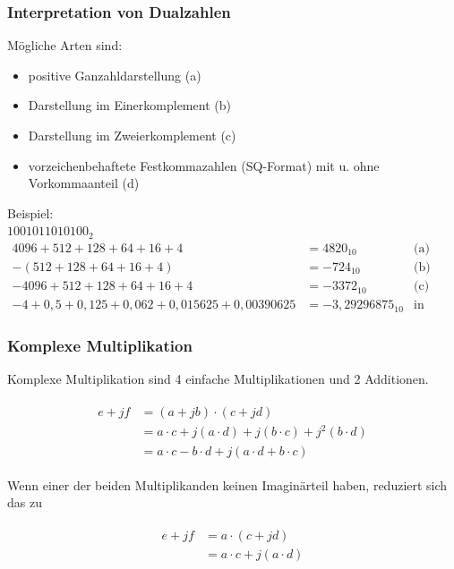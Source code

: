 

\begin{frame}\frametitle{Interpretation von Dualzahlen}
 \medskip
 Mögliche Arten sind:
 \begin{itemize}
  \item positive Ganzahldarstellung (a)
  \item Darstellung im Einerkomplement (b)
  \item Darstellung im Zweierkomplement (c)
  \item vorzeichenbehaftete Festkommazahlen (SQ-Format) mit u. ohne Vorkommaanteil (d)
 \end{itemize}
\medskip
\pause
Beispiel:\\
\medskip
\hspace{1cm}$1001011010100_2$
 \begin{align*}
    4096+512+128+64+16+4 &=  4820_{10}   &\textrm{(a)}\\
    - (512+128+64+16+4) & = -724_{10}   &\textrm{(b)}\\
   -4096+512+128+64+16+4 &= -3372_{10}   &\textrm{(c)}\\
   -4+0,5+0,125+0,062+0,015625+0,00390625 &= -3,29296875_{10} &\textrm{in S2Q10 (d)}
 \end{align*} 
\end{frame}

\begin{frame}\frametitle{Komplexe Multiplikation}

Komplexe Multiplikation sind 4 einfache Multiplikationen und 2 Additionen.

 \begin{align*}\label{eq:komplexe_Multiplikation}
\begin{split}
 e + jf &= (a + jb) \cdot (c + jd)\\
        &= a \cdot c + j(a \cdot d) + j(b \cdot c) + j^2(b \cdot d)\\
        &= a \cdot c - b \cdot d + j(a \cdot d + b \cdot c)
\end{split}
  \end{align*}
  
  Wenn einer der beiden Multiplikanden keinen Imaginärteil haben, reduziert sich das zu 

 \begin{align*}\label{eq:halb_komplexe_Multiplikation}
 \begin{split}
  e + jf &= a \cdot (c + jd)\\
         &= a \cdot c + j(a \cdot d)\\
 \end{split}
 \end{align*}
\end{frame}


